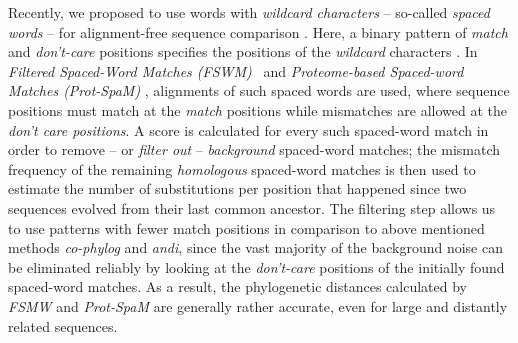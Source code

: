 \documentclass[review]{elsarticle}
\begin{document}
Recently, we proposed to use words with {\em wildcard characters} -- so-called \textit{spaced words} -- for alignment-free sequence comparison \cite{lei:bod:hor:lin:mor:14,hor:lin:bod:etal:14}. 
Here, a  binary pattern of {\em match} and {\em don't-care} positions specifies the positions of the {\em wildcard} characters \cite{oun:lon:15,noe:17,gir:com:piz:18}. In \textit{Filtered Spaced-Word Matches (FSWM)}~\cite{lei:soh:mor:17} and {\em Proteome-based Spaced-word Matches (Prot-SpaM)} \cite{lei:sch:sch:etal:18}, alignments of such spaced words are used, where sequence positions must match at the {\em match} positions while mismatches are allowed at the \textit{don't care positions}. 
A score is calculated for every such spaced-word match in order to remove -- or {\em filter out} -- {\em background} spaced-word matches; the mismatch frequency of the remaining \textit{homologous} spaced-word matches is then used to estimate the number of substitutions per position that happened since two sequences evolved from their last common ancestor. The filtering step allows us to use patterns with fewer match positions in comparison to above mentioned methods {\em co-phylog} and {\em andi}, since the vast majority of the background noise can be eliminated reliably by looking at the {\em don't-care} positions of the initially found spaced-word matches. As a result, the phylogenetic distances calculated by {\em FSMW} and {\em Prot-SpaM} are generally rather accurate, even for large and distantly related sequences.
\end{document}
